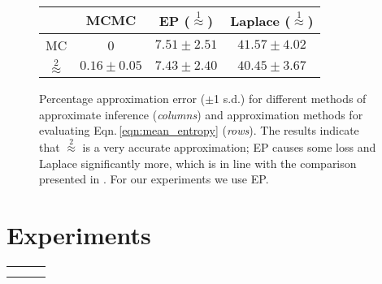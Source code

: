 \documentclass[twoside]{article}
\newcommand{\ourmethod}{BALD } %
\begin{document}

\begin{figure}[t]\centering
\begin{tabular}{|c|c|c|c|}
\hline
&MCMC&EP ($\stackrel{1}{\approx}$)&Laplace ($\stackrel{1}{\approx}$)\\ \hline
\hline
MC & 0 & $7.51\pm2.51$ & $41.57\pm4.02$ \\
$\stackrel{2}{\approx}$ & $0.16\pm0.05$ & $7.43\pm2.40$ & $40.45\pm3.67$ \\ \hline
\end{tabular}
\caption{Percentage approximation error ($\pm$1 s.d.) for different methods of approximate inference (\emph{columns}) and approximation methods for evaluating Eqn.\,\eqref{eqn:mean_entropy} (\emph{rows}). The results indicate that {\scriptsize $\stackrel{2}{\approx}$} is a very accurate approximation; EP causes some loss and Laplace significantly more, which is in line with the comparison presented in \cite{Kuss05}. For our experiments we use EP.}\label{fig:trick_results}
\end{figure}

\section{Experiments} \label{sec:experiments}

\begin{figure*}[t]
\begin{center}
\begin{tabular}{ccc}
&
&
\\
&
&
 \\
\end{tabular}
\end{center}
\caption{\emph{Top:} Evaluation on artificial datasets. Exemplars of the two classes are shown with black squares (\ref{plots:positives}) and red circles (\ref{plots:negatives}). \emph{Bottom:} Results of active learning with nine methods: random query (\ref{plots:rand}), \ourmethod (\ref{plots:BALD}),  MES (\ref{plots:maxent}), QBC with the vote criterion with 2 (\ref{plots:QBC2}) and 100 (\ref{plots:QBC100}) committee members, active SVM (\ref{plots:SVM}), IVM (\ref{plots:IVM}), decision theoretic: \cite{kapoor2007} (\ref{plots:dec}), \cite{zhu2003} (\ref{plots:semi}) and empirical error (\ref{plots:emp}).}
\label{fig:artificial}
\end{figure*}
\end{document}

